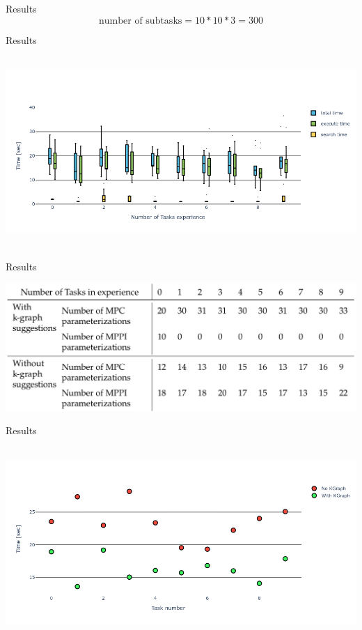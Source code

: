 \begin{frame}[fragile]{Results} 
\[\textrm{number of subtasks} = 10 * 10 * 3 = 300\]
\end{frame}


\begin{frame}[fragile]{Results} 
\begin{center}
  \hbox{\hspace{-0.7cm} \includegraphics[width=1.1\textwidth]{figures/results/random_drive_time_k-graph} }
\end{center}
\end{frame}

\begin{frame}[fragile]{Results} 
\begin{center}
\includegraphics[width=1.0\textwidth]{figures/results/random_drive_para}
\end{center}
\end{frame}

\begin{frame}[fragile]{Results} 
\begin{center}
  \hbox{\hspace{-0.7cm} \includegraphics[width=1.1\textwidth]{figures/results/random_drive_time_vs}}
\end{center}
\end{frame}

